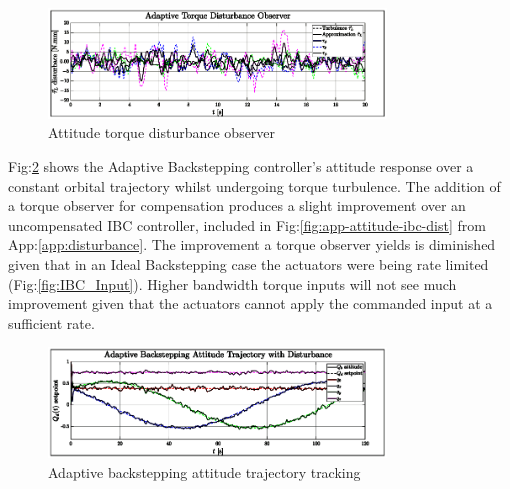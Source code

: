 \begin{figure}[htbp]
\vspace{-10pt}
\centering
\includegraphics[width=0.8\textwidth]{graphs/torque-observer}
\vspace{-10pt}
\caption{Attitude torque disturbance observer}
\vspace{-18pt}
\label{fig:torque-observer}
\end{figure}
\par
Fig:\ref{fig:ABC_trajectory} shows the Adaptive Backstepping controller's attitude response over a constant orbital trajectory whilst undergoing torque turbulence. The addition of a torque observer for compensation produces a slight improvement over an uncompensated IBC controller, included in Fig:\ref{fig:app-attitude-ibc-dist} from App:\ref{app:disturbance}. The improvement a torque observer yields is diminished given that in an Ideal Backstepping case the actuators were being rate limited (Fig:\ref{fig:IBC_Input}). Higher bandwidth torque inputs will not see much improvement given that the actuators cannot apply the commanded input at a sufficient rate.
\begin{figure}[hbtp]
\vspace{-6pt}
\centering
\includegraphics[width=0.8\textwidth]{graphs/ABC_trajectory}
\vspace{-10pt}
\caption{Adaptive backstepping attitude trajectory tracking}
\label{fig:ABC_trajectory}
\vspace{-16pt}
\end{figure}

